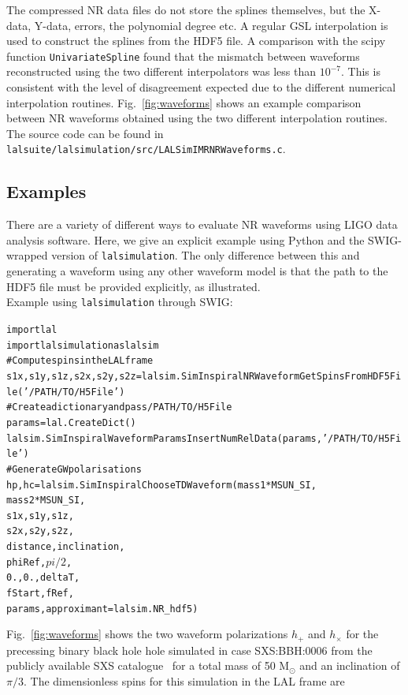 \documentclass[11pt,tightenlines,article,amssymb,amsmath,amsfonts,superscriptaddress,nofootinbib]{revtex4}
\begin{document}
The compressed NR data files do not store the splines themselves, but the X-data, Y-data, errors, the polynomial degree etc.  A regular GSL interpolation
is used to construct the splines from the HDF5 file. A comparison with the
scipy function \texttt{UnivariateSpline} found that the mismatch between
waveforms reconstructed using the two different interpolators was less than
$10^{-7}$. This is consistent with the level of disagreement expected due to the different numerical interpolation routines. Fig.~\ref{fig:waveforms}
shows an example comparison between NR waveforms obtained using the two
different interpolation routines.
The source code can be found in \texttt{lalsuite/lalsimulation/src/LALSimIMRNRWaveforms.c}.


\subsection{Examples}
There are a variety of different ways to evaluate NR waveforms using LIGO data analysis software. Here, we give an explicit example
using Python and the SWIG-wrapped version of \texttt{lalsimulation}.
The only difference between this and generating a waveform using any other
waveform model is that the path to the HDF5 file must be provided explicitly,
as illustrated. \\
Example using \texttt{lalsimulation} through SWIG:
\begin{alltt}
import lal
import lalsimulation as lalsim
# Compute spins in the LAL frame
s1x, s1y, s1z, s2x, s2y, s2z = \newline lalsim.SimInspiralNRWaveformGetSpinsFromHDF5File('/PATH/TO/H5File')
# Create a dictionary and pass /PATH/TO/H5File
params = lal.CreateDict()
lalsim.SimInspiralWaveformParamsInsertNumRelData(params, '/PATH/TO/H5File')
# Generate GW polarisations 
hp, hc = lalsim.SimInspiralChooseTDWaveform(mass1 * MSUN_SI, 
	              mass2 * MSUN_SI,
              s1x, s1y, s1z,
              s2x, s2y, s2z, 
              distance, inclination,
              phiRef, $pi/2$,
              0., 0., deltaT, 
              fStart, fRef,
              params, approximant=lalsim.NR_hdf5)
\end{alltt}
Fig.~\ref{fig:waveforms} shows the two waveform polarizations $h_+$ and $h_{\times}$ for the precessing binary black hole hole simulated in case 
SXS:BBH:0006 from the publicly available SXS catalogue~\cite{Mroue:2013xna} for a total mass of 50 $\mathrm{M}_\odot$ and an inclination of $\pi/3$. The dimensionless spins for this simulation in the LAL frame are 
\end{document}
